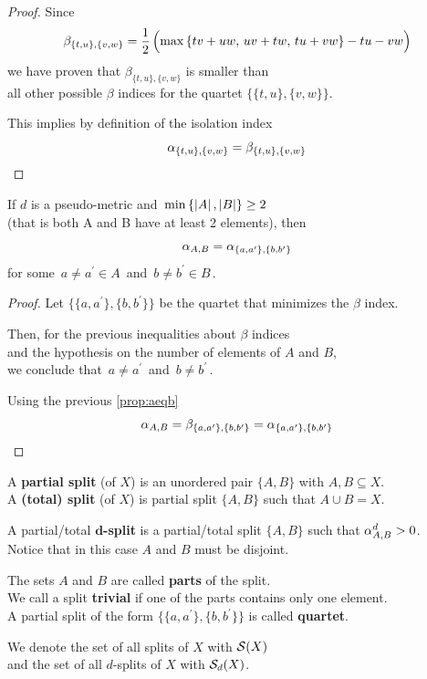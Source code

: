 \documentclass[./main.tex]{subfiles}
\begin{document}
\begin{proof}
    Since
    \[ \beta_{\{t,u\},\{v,w\}} = \frac{1}{2}\, \Bigl( \max {\{ tv + uw,\, uv + tw,\, tu + vw \}} - tu - vw \Bigr) \]
    we have proven that $\beta_{\{t,u\},\{v,w\}}$ is smaller than \\[2pt]
    \bsp all other possible $\beta$ indices for the quartet $\bigl\{ \{t,u\},\{v,w\} \bigr\}$. \medskip

    This implies by definition of the isolation index
    \[ \alpha_{\{t,u\},\{v,w\}} = \beta_{\{t,u\},\{v,w\}} \nospblw \]
\end{proof}

\begin{corollary} \label{cor:aeqa}
    If $d$ is a pseudo-metric and $\, \min {\{ \left\lvert A\right\rvert,\left\lvert B\right\rvert \}} \geq 2 \,$ \\[2pt]
    \bsp (that is both A and B have at least 2 elements), then
    \[ \alpha_{A,B} = \alpha_{\{a,a^\prime\},\{b,b^\prime\}} \]
    for some $\, a \neq a^\prime \in A \,$ and $\, b \neq b^\prime \in B \,$.
\end{corollary}
\begin{proof}
    Let $\bigl\{ \{a,a^\prime\},\{b,b^\prime\} \bigr\}$ be the quartet that minimizes the $\beta$ index.
    
    Then, for the previous inequalities about $\beta$ indices \\
    \bsp and the hypothesis on the number of elements of $A$ and $B$, \\
    we conclude that $\, a \neq a^\prime \,$ and $\, b \neq b^\prime \,$.
    
    Using the previous \autoref{prop:aeqb}
    \[ \aAB = \beta_{\{a,a^\prime\},\{b,b^\prime\}} = \alpha_{\{a,a^\prime\},\{b,b^\prime\}} \nospblw \qedhere \]
\end{proof}

\begin{definition}
    A \textbf{partial split} (of $X$) is an unordered pair $\{A,B\}$ with $A,B \subseteq X$. \\
    A \textbf{(total) split} (of $X$) is partial split $\{A,B\}$ such that $A \cup B = X$.
    
    A partial/total \textbf{$\bm{d}$-split} is a partial/total split $\{A,B\}$ such that $\alpha_{A,B}^d > 0$. \\
    Notice that in this case $A$ and $B$ must be disjoint. \bigskip
    
    The sets $A$ and $B$ are called \textbf{parts} of the split. \\
    We call a split \textbf{trivial} if one of the parts contains only one element. \\
    A partial split of the form $\bigl\{ \{a,a^\prime\}, \{b,b^\prime\} \bigr\}$ is called \textbf{quartet}.

    We denote the set of all splits of $X$ with ${\mathcal{S}}(X)$ \\
    \bsp and the set of all $d$-splits of $X$ with ${\mathcal{S}}_d(X)$.
\end{definition}
\end{document}
